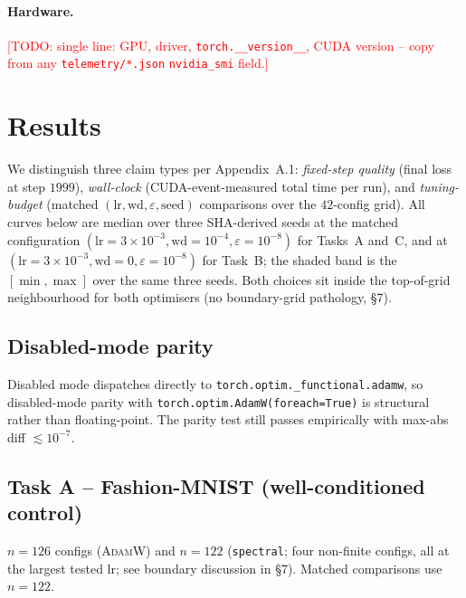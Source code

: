 \documentclass{article}
\newcommand{\todo}[1]{\textcolor{red}{[TODO: #1]}}
\newcommand{\Adamw}{\textsc{AdamW}}
\begin{document}
\paragraph{Hardware.}
\todo{single line: GPU, driver, \texttt{torch.\_\_version\_\_}, CUDA
version -- copy from any \texttt{telemetry/*.json} \texttt{nvidia\_smi}
field.}

\section{Results}

We distinguish three claim types per Appendix~A.1:
\emph{fixed-step quality} (final loss at step $1999$),
\emph{wall-clock} (CUDA-event-measured total time per run), and
\emph{tuning-budget} (matched
$(\text{lr},\text{wd},\varepsilon,\text{seed})$ comparisons over the
$42$-config grid).  All curves below are median over three
SHA-derived seeds at the matched configuration $(\text{lr}=3\!\times\!10^{-3},
\text{wd}=10^{-4}, \varepsilon=10^{-8})$ for Tasks~A and~C, and at
$(\text{lr}=3\!\times\!10^{-3}, \text{wd}=0, \varepsilon=10^{-8})$ for
Task~B; the shaded band is the $[\min, \max]$ over the same three
seeds.  Both choices sit inside the
top-of-grid neighbourhood for both optimisers
(no boundary-grid pathology, §7).

\subsection{Disabled-mode parity}
Disabled mode dispatches directly to
\texttt{torch.optim.\_functional.adamw}, so disabled-mode parity with
\texttt{torch.optim.AdamW(foreach=True)} is structural rather than
floating-point.  The parity test still passes empirically with
max-abs diff $\lesssim 10^{-7}$.

\subsection{Task A -- Fashion-MNIST (well-conditioned control)}
$n=126$ configs (\Adamw) and $n=122$ (\texttt{spectral}; four
non-finite configs, all at the largest tested lr; see boundary
discussion in §7).  Matched comparisons use $n=122$.
\end{document}
